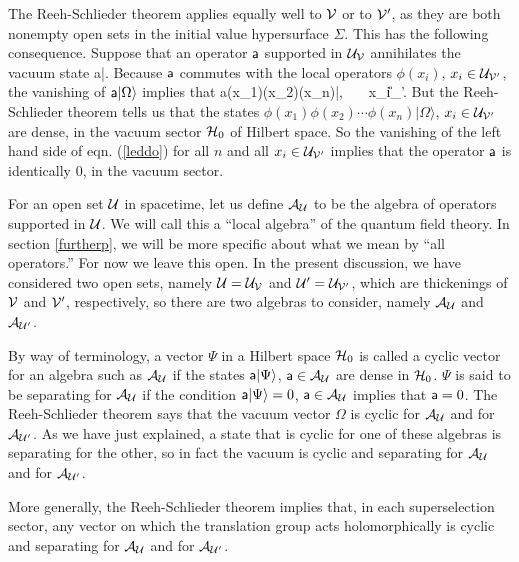 \documentclass[12pt]{article}
\def\a{{\sf a}}
\numberwithin{equation}{section}
\def\A{{\mathcal A}}
\begin{document}
The Reeh-Schlieder theorem applies equally well to ${\mathcal V}$ or to ${\mathcal V}'$, as they are both nonempty open sets in the initial value hypersurface
$\Sigma$.   This has the following consequence.  
Suppose that an operator $\a$ supported in ${\mathcal U}_{\mathcal V}$ annihilates the vacuum state 
\be\label{peddo} \a|\Omega{}. \ee
Because $\a$ commutes with the local operators $\phi(x_i)$, $x_i\in {\mathcal U}_{{\mathcal V}'}$,  the vanishing of $\a|\Omega\rangle $ implies
that
\be\label{leddo} \a \phi(x_1)\phi(x_2)\cdots \phi(x_n)|\Omega{}, ~~~x_i\in \U_{\V'}. \ee
But the Reeh-Schlieder theorem tells us that the states $\phi(x_1)\phi(x_2) \cdots\allowbreak  \phi(x_n)|\Omega\rangle$, $x_i\in{\mathcal U}_{{\mathcal V}'}$ are
dense, in the vacuum sector ${\mathcal H}_0$ of Hilbert space.  So the vanishing of the left hand side of eqn. (\ref{leddo}) for all $n$ and all
$x_i\in {\mathcal U}_{{\mathcal V}'}$ implies that the operator $\a$  is identically 0, in the vacuum sector.


For an open set ${\mathcal U}$ in spacetime, let us define $\A_\U$ to be the algebra of operators supported in ${\mathcal U}$.  We will call this
a ``local algebra'' of the quantum field theory.  In section \ref{furtherp}, we will be more specific about what we mean by ``all operators.'' For
now we leave this open.
In the present discussion, we have considered two open sets, namely ${\mathcal U}={\mathcal U}_{\mathcal V}$ and ${\mathcal U}'={\mathcal U}_{{\mathcal V}'}$, which are thickenings of ${\mathcal V}$ and ${\mathcal V}'$,
respectively, so there are two algebras to consider, namely $\A_\U$ and $\A_{\U'}$.  




By way of terminology, a vector $\Psi$ in a Hilbert space ${\mathcal H}_0$ is called a cyclic vector for an algebra such as $\A_\U$ if the states
$\a|\Psi\rangle$, $\a\in \A_\U$ are dense in ${\mathcal H}_0$.     $\Psi$ is said to be separating for $\A_\U$ if the condition $\a|\Psi\rangle=0$,
$\a\in\A_\U$ implies that $\a=0$.  The Reeh-Schlieder theorem says that the vacuum vector $\Omega$ is cyclic for $\A_\U$ and
for $\A_{\U'}$.  As we have just explained,  a state that is cyclic for one of these algebras is separating for the other, so in fact the
vacuum is cyclic and separating for $\A_\U$ and for $\A_{\U'}$.


More generally, the Reeh-Schlieder theorem implies that, in each superselection sector,
any vector on which the translation group acts holomorphically is
cyclic and separating for $\A_\U$ and for $\A_{\U'}$.  
\end{document}
